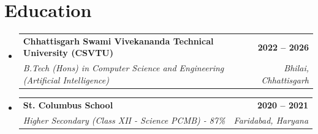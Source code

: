 \documentclass[letterpaper,10.5pt]{article}
\makeatletter
\newcommand{\resumeSubheading}[4]{
  \vspace{-1pt}\item
    \begin{tabular*}{0.97\textwidth}[t]{l@{\extracolsep{\fill}}r}
      \textbf{#1} & \color{greenTheme}\textbf{#2} \\
      \textit{\small#3} & \textit{\small\color{lightGray} #4} \\
    \end{tabular*}\vspace{-6pt}
}
\newcommand{\resumeSubHeadingListStart}{\begin{itemize}[leftmargin=0.15in, label={}]}
\newcommand{\resumeSubHeadingListEnd}{\end{itemize}}
\makeatother
\begin{document}
\section{Education}
\resumeSubHeadingListStart
\resumeSubheading{Chhattisgarh Swami Vivekananda Technical University (CSVTU)}{2022 -- 2026}{B.Tech (Hons) in Computer Science and Engineering (Artificial Intelligence)}{Bhilai, Chhattisgarh}
\resumeSubHeadingListEnd

\resumeSubHeadingListStart
\resumeSubheading{St. Columbus School}{2020 -- 2021}{Higher Secondary (Class XII - Science PCMB) - 87\%}{Faridabad, Haryana}
\resumeSubHeadingListEnd
\end{document}
